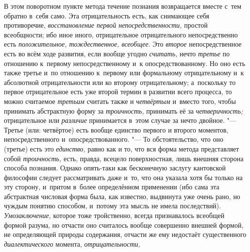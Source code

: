В этом поворотном пункте метода течение познания возвращается
вместе с~тем обратно в~себя само. Эта отрицательность есть, как снимающее
себя противоречие, {\em восстановление
первой непосредственности,} простой всеобщности; ибо иное
иного, отрицательное отрицательного непосредственно есть
{\em положительное, тождественное, всеобщее}. Это {\em второе}
непосредственное есть во всём ходе развития, если вообще угодно {\em считать,}
нечто {\em третье} по отношению к~первому непосредственному и~к
опосредствованному. Но оно есть также третье и~по отношению к~первому или
формальному отрицательному и~к абсолютной отрицательности или ко второму
отрицательному; а~поскольку то первое отрицательное есть уже второй термин
в развитии всего процесса, то можно считаемое {\em третьим} считать
также и {\em четвёртым} и~вместо того, чтобы принимать абстрактную форму за
{\em троичность,} принимать её за {\em четверичность;} отрицательное или
{\em различие} принимается в~этом случае за нечто двойное. "---
Третье (или: четвёртое) есть вообще единство первого и
второго моментов, непосредственного и~опосредствованного. "---
То обстоятельство, что оно (третье) есть это {\em единство,} равно как
и то, что вся форма метода представляет собой {\em троичность,} есть,
правда, всецело поверхностная, лишь внешняя сторона способа познания.
Однако опять-таки как бесконечную заслугу кантовской
философии
следует рассматривать даже и~то, что она указала хотя бы
только на эту сторону, и~притом в~более определённом применении (ибо сама
эта абстрактная числовая форма была, как известно, выдвинута уже очень
рано, но чуждым понятию способом, и~потому эта мысль не имела последствий).
{\em Умозаключение,} которое тоже тройственно, всегда признавалось всеобщей
формой разума, но отчасти оно считалось вообще совершенно внешней формой, не
определяющей природы содержания, отчасти же ему недостаёт существенного
{\em диалектического} момента, {\em отрицательности,}

